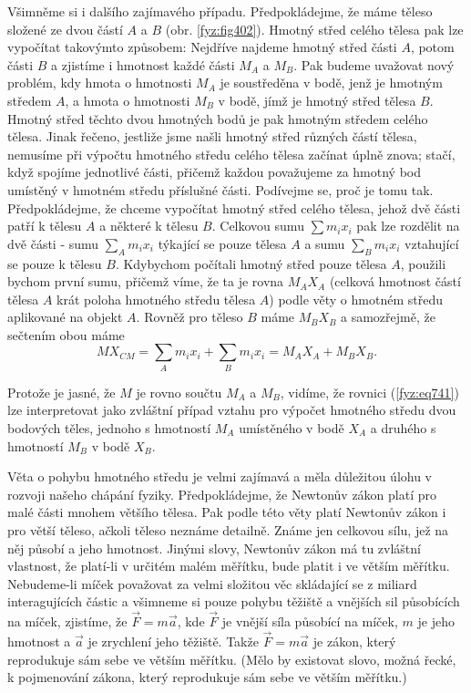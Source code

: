     Všimněme si i dalšího zajímavého případu. Předpokládejme, že máme těleso složené ze dvou částí
    \(A\) a \(B\) (obr. \ref{fyz:fig402}). Hmotný střed celého tělesa pak lze vypočítat takovýmto
    způsobem: Nejdříve najdeme hmotný střed části \(A\), potom části \(B\) a zjistíme i hmotnost
    každé části \(M_A\) a \(M_B\). Pak budeme uvažovat nový problém, kdy hmota o hmotnosti \(M_A\)
    je soustředěna v bodě, jenž je hmotným středem \(A\), a hmota o hmotnosti \(M_B\) v bodě, jímž
    je hmotný střed tělesa \(B\). Hmotný střed těchto dvou hmotných bodů je pak hmotným středem
    celého tělesa. Jinak řečeno, jestliže jsme našli hmotný střed různých částí tělesa, nemusíme při
    výpočtu hmotného středu celého tělesa začínat úplně znova; stačí, když spojíme jednotlivé části,
    přičemž každou považujeme za hmotný bod umístěný v hmotném středu příslušné části. Podívejme se,
    proč je tomu tak. Předpokládejme, že chceme vypočítat hmotný střed celého tělesa, jehož dvě
    části patří k tělesu \(A\) a některé k tělesu \(B\). Celkovou sumu \(∑m_ix_i\) pak lze rozdělit
    na dvě části - sumu \(∑_Am_ix_i\) týkající se pouze tělesa \(A\) a sumu \(∑_Bm_ix_i\) vztahující
    se pouze k tělesu \(B\). Kdybychom počítali hmotný střed pouze tělesa \(A\), použili bychom
    první sumu, přičemž víme, že ta je rovna \(M_AX_A\) (celková hmotnost částí tělesa \(A\) krát
    poloha hmotného středu tělesa \(A\)) podle věty o hmotném středu aplikované na objekt \(A\).
    Rovněž pro těleso \(B\) máme \(M_BX_B\) a samozřejmě, že sečtením obou máme
    \begin{equation}\label{fyz:eq741}
      MX_{CM}=∑_Am_ix_i+∑_Bm_ix_i=M_AX_A+M_BX_B.
    \end{equation}

    Protože je jasné, že \(M\) je rovno součtu \(M_A\) a \(M_B\), vidíme, že rovnici
    (\ref{fyz:eq741}) lze interpretovat jako zvláštní případ vztahu pro výpočet hmotného středu dvou
    bodových těles, jednoho s hmotností \(M_A\) umístěného v bodě \(X_A\) a druhého s hmotností
    \(M_B\) v bodě \(X_B\).

    Věta o pohybu hmotného středu je velmi zajímavá a měla důležitou úlohu v rozvoji našeho chápání
    fyziky. Předpokládejme, že Newtonův zákon platí pro malé části mnohem většího tělesa. Pak podle
    této věty platí Newtonův zákon i pro větší těleso, ačkoli těleso neznáme detailně. Známe jen
    celkovou sílu, jež na něj působí a jeho hmotnost. Jinými slovy, Newtonův zákon má tu zvláštní
    vlastnost, že platí-li v určitém malém měřítku, bude platit i ve větším měřítku. Nebudeme-li
    míček považovat za velmi složitou věc skládající se z miliard interagujících částic a všimneme
    si pouze pohybu těžiště a vnějších sil působících na míček, zjistíme, že \(\vec{F}= m\vec{a}\),
    kde \(\vec{F}\) je vnější síla působící na míček, \(m\) je jeho hmotnost a \(\vec{a}\) je
    zrychlení jeho těžiště. Takže \(\vec{F}= m\vec{a}\) je zákon, který reprodukuje sám sebe ve
    větším měřítku. (Mělo by existovat slovo, možná řecké, k pojmenování zákona, který reprodukuje
    sám sebe ve větším měřítku.)

